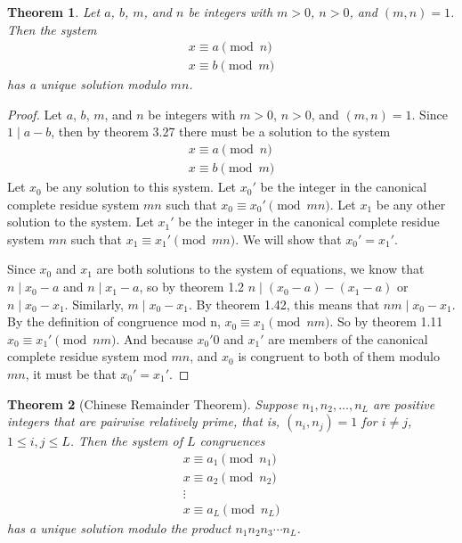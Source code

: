 \documentclass[12pt,leqno]{article}
\numberwithin{equation}{section}
\newtheorem{thm}{Theorem}[section]
\theoremstyle{definition}
\begin{document}
\begin{thm}
Let $a$, $b$, $m$, and $n$ be integers with $m > 0$, $n > 0$, and
$(m,n)=1$.  Then the system
\[ \begin{array}{l}
x \equiv a \pmod{n} \\
x \equiv b \pmod{m} \end{array} \] has a unique solution modulo
$mn$.
\end{thm}

\begin{proof}[Proof]
Let $a$, $b$, $m$, and $n$ be integers with $m > 0$, $n > 0$, and $(m,n)=1$.  Since $1 \mid a - b$, then by theorem 3.27 there must be a solution to the system
\[ \begin{array}{l}
x \equiv a \pmod{n} \\
x \equiv b \pmod{m} \end{array} \]
Let $x_0$ be any solution to this system.  Let $x_0'$ be the integer in the canonical complete residue system $mn$ such that $x_0 \equiv x_0' \pmod{mn}$. Let $x_1$ be any other solution to the system.  Let $x_1'$ be the integer in the canonical complete residue system $mn$ such that $x_1 \equiv x_1' \pmod{mn}$.  We will show that $x_0' = x_1'$.

Since $x_0$ and $x_1$ are both solutions to the system of equations, we know that $n \mid x_0 - a$ and $n \mid x_1 - a$, so by theorem 1.2 $n \mid (x_0 - a) - (x_1 - a)$ or $n \mid x_0 - x_1$.  Similarly, $m \mid x_0 - x_1$.  By theorem 1.42, this means that $nm \mid x_0 - x_1$.  By the definition of congruence mod n, $x_0 \equiv x_1 \pmod{nm}$.  So by theorem 1.11 $x_0 \equiv x_1' \pmod{nm}$.  And because $x_0'0$ and $x_1'$ are members of the canonical complete residue system mod $mn$, and $x_0$ is congruent to both of them modulo $mn$, it must be that $x_0' = x_1'$.
\end{proof}


\begin{thm}[Chinese Remainder Theorem]
Suppose $n_1, n_2, \hdots, n_L$ are positive integers that are
pairwise relatively prime, that is, $(n_i, n_j)=1$ for $i\neq j$,
$1\leq i, j \leq L$.  Then the system of $L$ congruences
\[ \begin{array}{c}
x \equiv a_1 \pmod{n_1} \\
x \equiv a_2 \pmod{n_2} \\
\vdots \\
x \equiv a_L \pmod{n_L} \end{array} \] has a unique solution modulo
the product $n_1 n_2  n_3 \cdots n_L$.
\end{thm}
\end{document}
